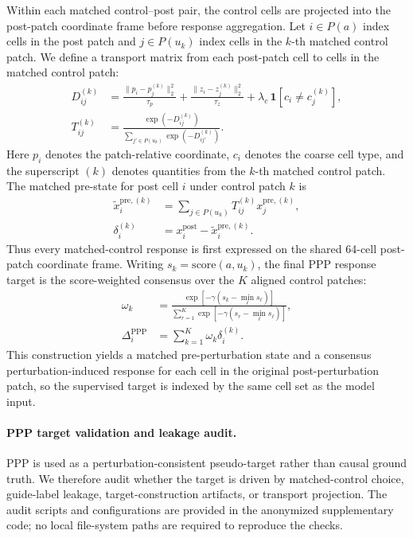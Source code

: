 \documentclass[sigconf,anonymous,review]{acmart}
\begin{document}
Within each matched control--post pair, the control cells are projected into the post-patch coordinate frame before response aggregation. Let $i\in P(a)$ index cells in the post patch and $j\in P(u_k)$ index cells in the $k$-th matched control patch. We define a transport matrix from each post-patch cell to cells in the matched control patch:
\[
\begin{aligned}
D_{ij}^{(k)}
&=
\frac{\|p_i-p_j^{(k)}\|_2^2}{\tau_p}
+
\frac{\|z_i-z_j^{(k)}\|_2^2}{\tau_z}
+
\lambda_c\,\mathbf{1}[c_i\neq c_j^{(k)}],\\
T_{ij}^{(k)}
&=
\frac{\exp(-D_{ij}^{(k)})}
{\sum_{j'\in P(u_k)}\exp(-D_{ij'}^{(k)})}.
\end{aligned}
\]
Here $p_i$ denotes the patch-relative coordinate, $c_i$ denotes the coarse cell type, and the superscript $(k)$ denotes quantities from the $k$-th matched control patch. The matched pre-state for post cell $i$ under control patch $k$ is
\[
\begin{aligned}
\widetilde{x}^{\mathrm{pre},(k)}_i
&=
\sum_{j\in P(u_k)}T^{(k)}_{ij}x^{\mathrm{pre},(k)}_j,\\
\delta_i^{(k)}
&=
x_i^{\mathrm{post}}-\widetilde{x}^{\mathrm{pre},(k)}_i .
\end{aligned}
\]
Thus every matched-control response is first expressed on the shared 64-cell post-patch coordinate frame. Writing $s_k=\mathrm{score}(a,u_k)$, the final PPP response target is the score-weighted consensus over the $K$ aligned control patches:
\[
\begin{aligned}
\omega_k
&=
\frac{
\exp[-\gamma(s_k-\min_{\ell}s_\ell)]
}{
\sum_{r=1}^{K}\exp[-\gamma(s_r-\min_{\ell}s_\ell)]
},\\
\Delta_i^{\mathrm{PPP}}
&=
\sum_{k=1}^{K}\omega_k\delta_i^{(k)} .
\end{aligned}
\]
This construction yields a matched pre-perturbation state and a consensus perturbation-induced response for each cell in the original post-perturbation patch, so the supervised target is indexed by the same cell set as the model input.

\paragraph{PPP target validation and leakage audit.}
PPP is used as a perturbation-consistent pseudo-target rather than causal ground truth. We therefore audit whether the target is driven by matched-control choice, guide-label leakage, target-construction artifacts, or transport projection. The audit scripts and configurations are provided in the anonymized supplementary code; no local file-system paths are required to reproduce the checks.
\end{document}
